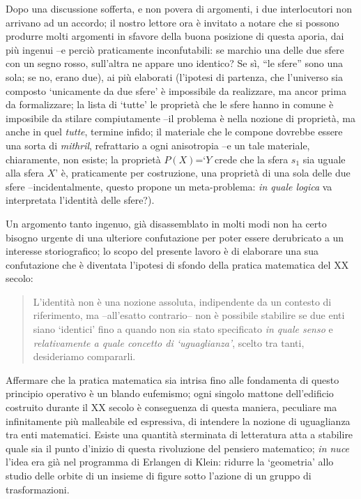 Dopo una discussione sofferta, e non povera di argomenti, i due interlocutori non arrivano ad un accordo; il nostro lettore ora è invitato a notare che si possono produrre molti argomenti in sfavore della buona posizione di questa aporia, dai più ingenui --e perciò praticamente inconfutabili: se marchio una delle due sfere con un segno rosso, sull'altra ne appare uno identico? Se sì, ``le sfere'' sono una sola; se no, erano due), ai più elaborati (l'ipotesi di partenza, che l'universo sia composto `unicamente da due sfere' è impossibile da realizzare, ma ancor prima da formalizzare; la lista di `tutte' le proprietà che le sfere hanno in comune è imposibile da stilare compiutamente --il problema è nella nozione di proprietà, ma anche in quel \emph{tutte}, termine infido; il materiale che le compone dovrebbe essere una sorta di \emph{mithril}, refrattario a ogni anisotropia --e un tale materiale, chiaramente, non esiste; la proprietà $P(X)$=`$Y$ crede che la sfera $s_1$ sia uguale alla sfera $X$' è, praticamente per costruzione, una proprietà di una sola delle due sfere --incidentalmente, questo propone un meta-problema: \emph{in quale logica} va interpretata l'identità delle sfere?).

Un argomento tanto ingenuo, già disassemblato in molti modi \cite{foobar,baz} non ha certo bisogno urgente di una ulteriore confutazione per poter essere derubricato a un interesse storiografico; lo scopo del presente lavoro è di elaborare una sua confutazione che è diventata l'ipotesi di sfondo della pratica matematica del XX secolo:
\begin{quote}
  L'identità non è una nozione assoluta, indipendente da un contesto di riferimento, ma --all'esatto contrario-- non è possibile stabilire se due enti siano `identici' fino a quando non sia stato specificato \emph{in quale senso} e \emph{relativamente a quale concetto di `uguaglianza'}, scelto tra tanti, desideriamo compararli.
\end{quote}
Affermare che la pratica matematica sia intrisa fino alle fondamenta di questo principio operativo è un blando eufemismo; ogni singolo mattone dell'edificio costruito durante il XX secolo è conseguenza di questa maniera, peculiare ma infinitamente più malleabile ed espressiva, di intendere la nozione di uguaglianza tra enti matematici. Esiste una quantità sterminata di letteratura atta a stabilire quale sia il punto d'inizio di questa rivoluzione del pensiero matematico; \emph{in nuce} l'idea era già nel programma di Erlangen di Klein: ridurre la `geometria' allo studio delle orbite di un insieme di figure sotto l'azione di un gruppo di trasformazioni.

